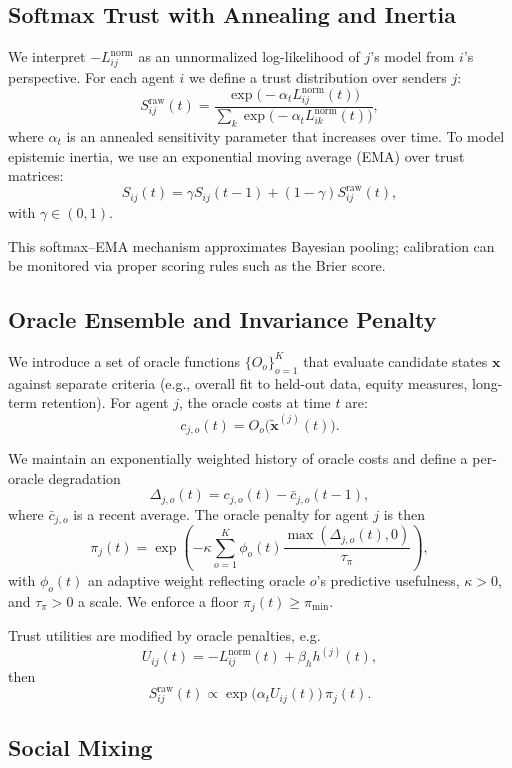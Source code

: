 \documentclass[11pt]{article}
\begin{document}
\subsection{Softmax Trust with Annealing and Inertia}

We interpret $-L_{ij}^{\text{norm}}$ as an unnormalized log-likelihood
of $j$'s model from $i$'s perspective.
For each agent $i$ we define a trust distribution over senders $j$:
\[
  S_{ij}^{\mathrm{raw}}(t)
  = \frac{
      \exp\!\bigl(-\alpha_t L_{ij}^{\text{norm}}(t)\bigr)
    }{
      \sum_{k} \exp\!\bigl(-\alpha_t L_{ik}^{\text{norm}}(t)\bigr)
    },
\]
where $\alpha_t$ is an annealed sensitivity parameter that increases
over time.
To model epistemic inertia, we use an exponential moving average
(EMA) over trust matrices:
\[
  S_{ij}(t) = \gamma S_{ij}(t-1)
             + (1-\gamma) S_{ij}^{\mathrm{raw}}(t),
\]
with $\gamma \in (0,1)$.

This softmax–EMA mechanism approximates Bayesian pooling; calibration
can be monitored via proper scoring rules such as the Brier score.

\subsection{Oracle Ensemble and Invariance Penalty}

We introduce a set of oracle functions $\{ O_o \}_{o=1}^K$ that
evaluate candidate states $\bm{x}$ against separate criteria (e.g.,
overall fit to held-out data, equity measures, long-term retention).
For agent $j$, the oracle costs at time $t$ are:
\[
  c_{j,o}(t) = O_o\bigl( \tilde{\bm{x}}^{(j)}(t) \bigr).
\]

We maintain an exponentially weighted history of oracle costs and define
a per-oracle degradation
\[
  \Delta_{j,o}(t) = c_{j,o}(t) - \bar{c}_{j,o}(t-1),
\]
where $\bar{c}_{j,o}$ is a recent average.
The oracle penalty for agent $j$ is then
\[
  \pi_j(t) = \exp\!\left(
    -\kappa
    \sum_{o=1}^K \phi_o(t)
    \frac{\max(\Delta_{j,o}(t), 0)}{\tau_\pi}
  \right),
\]
with $\phi_o(t)$ an adaptive weight reflecting oracle $o$'s predictive
usefulness, $\kappa > 0$, and $\tau_\pi > 0$ a scale.
We enforce a floor $\pi_j(t) \geq \pi_{\min}$.

Trust utilities are modified by oracle penalties, e.g.
\[
  U_{ij}(t) = - L_{ij}^{\text{norm}}(t) + \beta_h h^{(j)}(t),
\]
then
\[
  S_{ij}^{\mathrm{raw}}(t)
  \propto \exp\bigl(\alpha_t U_{ij}(t)\bigr) \, \pi_j(t).
\]

\subsection{Social Mixing}
\end{document}

